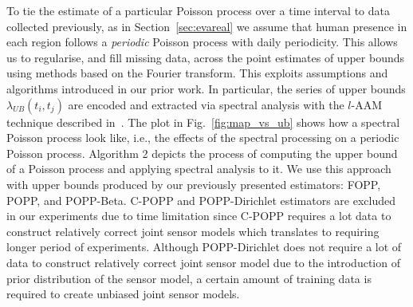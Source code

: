 To tie the estimate of a particular Poisson process over a time interval to data collected previously, as in Section~\ref{sec:evareal} we assume that human presence in each region follows a \emph{periodic} Poisson process with daily periodicity. This allows us to regularise, and fill missing data, across the point estimates of upper bounds using methods based on the Fourier transform.  This exploits assumptions and algorithms introduced in our prior work. In particular, the series of upper bounds $\lambda_{UB}(t_i, t_j)$ are encoded and extracted via spectral analysis with the $l$-AAM technique described in~\cite{jovan_iros16}. The plot in Fig.~\ref{fig:map_vs_ub} shows how a spectral Poisson process look like, i.e., the effects of the spectral processing on a periodic Poisson process. Algorithm 2 depicts the process of computing the upper bound of a Poisson process and applying spectral analysis to it. We use this approach with upper bounds produced by our previously presented estimators: FOPP, POPP, and POPP-Beta. C-POPP and POPP-Dirichlet estimators are excluded in our experiments due to time limitation since C-POPP requires a lot data to construct relatively correct joint sensor models which translates to requiring longer period of experiments. Although POPP-Dirichlet does not require a lot of data to construct relatively correct joint sensor model due to the introduction of prior distribution of the sensor model, a certain amount of training data is required to create unbiased joint sensor models. 

